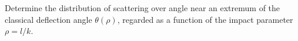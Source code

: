  Determine the distribution of scattering over angle near an extremum of the classical deflection angle $\theta(\rho)$, regarded as a function of the impact parameter $\rho=l/k$.
